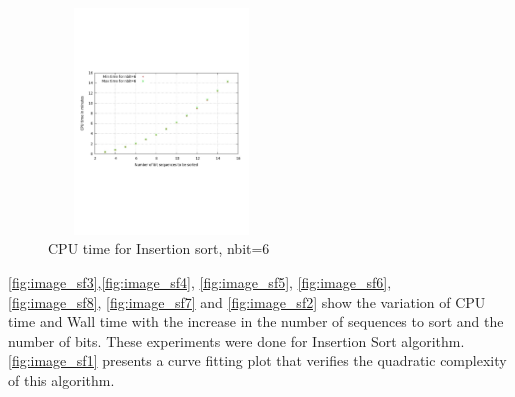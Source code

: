 \documentclass{acm_proc_article-sp}
\begin{document}
\begin{figure} %
\centering
\includegraphics[width=6cm, height=6cm]{fsort8.pdf} 
\caption{CPU time for Insertion sort, nbit=6} 
\label{fig:image_sf8} %
\end{figure}


 \autoref{fig:image_sf3},\autoref{fig:image_sf4}, \autoref{fig:image_sf5}, \autoref{fig:image_sf6}, \\ \autoref{fig:image_sf8}, \autoref{fig:image_sf7} and \autoref{fig:image_sf2} show the variation of CPU time and Wall time with the increase in the number of sequences to sort and the number of bits. These experiments were done for Insertion Sort algorithm. \autoref{fig:image_sf1} presents a  curve fitting plot that verifies the quadratic complexity of this algorithm.

\begin{table}
\caption{Wall time for Bitonic Sort}
\end{table}
\end{document}
